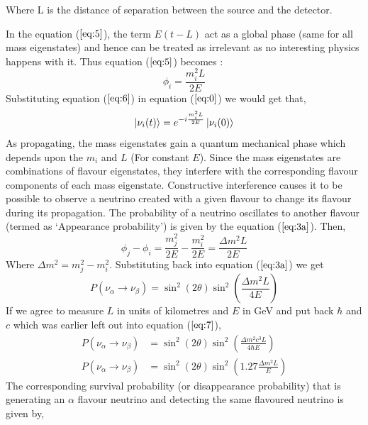 \documentclass[12pt,a4paper]{report}
\begin{document}
Where L is the distance of separation between the source and the detector.\par
In the equation ($\ref{eq:5}$),  the term $ E( t - L)$ act as a global phase (same for all mass eigenstates) and hence can be treated as irrelevant as no interesting physics happens with it. Thus equation ($\ref{eq:5}$) becomes :
\begin{equation}
\label{eq:6}
\phi_{i} = \frac{m_{i}^2 L}{2E}
\end{equation}
Substituting equation ($\ref{eq:6}$)  in  equation ($\ref{eq:0}$)  we would get that,
\begin{equation}
\ket{\nu_{i} (t)} = e^{-i\frac{m_{i}^2 L}{2E}}\ket{\nu_{i} (0)}
\end{equation}
As propagating, the mass eigenstates gain a quantum mechanical phase which depends upon the $ m_{i}$ and $L$ (For constant $E$). Since the mass eigenstates are combinations of flavour eigenstates, they interfere with the corresponding flavour components of each mass eigenstate. Constructive interference causes it to be possible to observe a neutrino created with a given flavour to change its flavour during its propagation. The probability of a neutrino oscillates to another flavour (termed as ‘Appearance probability’) is given by the equation ($\ref{eq:3a}$). Then,
\begin{equation}
\label{eq:6a}
\phi_{j} - \phi_{i} = \frac{m_{j}^{2}}{2E} - \frac{m_{i}^2}{2E} = \frac{\Delta m^{2} L}{2E}
\end{equation} 
Where $\Delta m^{2} = m_{j}^{2}-m_{i}^{2}$.
Substituting back into equation ($\ref{eq:3a}$) we get 
\begin{equation}
\label{eq:7}
P(\nu_{\alpha} \rightarrow \nu_{\beta}) = \sin^{2}\left(2\theta\right)\sin^{2}\left(\frac{\Delta m^{2} L}{4E}\right)
\end{equation}
If we agree to measure $L$ in units of kilometres and $E$ in GeV and put back $\hbar$ and $c$ which was earlier left out into equation ($\ref{eq:7}$),
\begin{equation*}
\label{eq:8}
\begin{split}
P(\nu_{\alpha} \rightarrow \nu_{\beta})&=\sin^{2}\left(2\theta\right)\sin^{2}\left(\frac{\Delta m^{2} c^{3} L}{4\hbar E}\right)\\
P(\nu_{\alpha} \rightarrow \nu_{\beta})&=\sin^{2}\left(2\theta\right)\sin^{2}\left(1.27\frac{\Delta m^{2} L}{E}\right)
\end{split}
\end{equation*}
The corresponding survival probability (or disappearance probability) that is generating an $\alpha$ flavour neutrino and detecting the same flavoured neutrino is given by,
\end{document}
